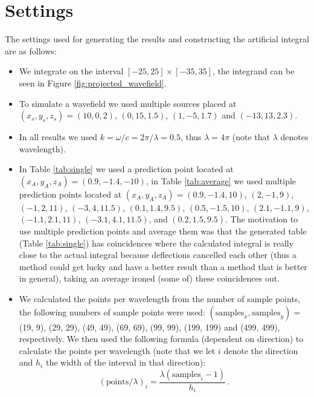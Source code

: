 \section{Settings}
\label{settings}
The settings used for generating the results and constructing the artificial integral are as follows:
\begin{itemize}
    \itemsep0pt
    \item We integrate on the interval $[-25, 25] \times [-35, 35]$, the integrand can be seen in Figure \ref{fig:projected_wavefield}.
    \item To simulate a wavefield we used multiple sources placed at $(x_s, y_s, z_s) = (10, 0, 2)$, $(0, 15, 1.5)$, $(1, -5, 1.7)$ and $(-13, 13, 2.3)$.
    \item In all results we used $k=\omega / c = 2 \pi / \lambda = 0.5$, thus $\lambda = 4 \pi$ (note that $\lambda$ denotes wavelength).
    \item In Table \ref{tab:single} we used a prediction point located at $(x_A, y_A, z_A) = (0.9, -1.4, -10)$, in Table \ref{tab:average} we used multiple prediction points located at $(x_A, y_A, z_A) = (0.9, -1.4, 10)$, $(2, -1, 9)$, $(-1, 2, 11)$, $(-3, 4, 11.5)$, $(0.1, 1.4, 9.5)$, $(0.5, -1.5, 10)$, $(2.1, -1.1, 9)$, $(-1.1, 2.1, 11)$, $(-3.1, 4.1, 11.5)$, and $(0.2, 1.5, 9.5)$. The motivation to use multiple prediction points and average them was that the generated table (Table \ref{tab:single}) has coincidences where the calculated integral is really close to the actual integral because deflections cancelled each other (thus a method could get lucky and have a better result than a method that is better in general), taking an average ironed (some of) these coincidences out.
    \item We calculated the points per wavelength from the number of sample points, the following numbers of sample points were used: $(\textrm{samples}_x, \textrm{samples}_y) =$ (19, 9), (29, 29), (49, 49), (69, 69), (99, 99), (199, 199) and (499, 499), respectively. We then used the following formula (dependent on direction) to calculate the points per wavelength (note that we let $i$ denote the direction and $h_i$ the width of the interval in that direction):
        \begin{equation}
            (\textrm{points} / \lambda)_i = \frac{\lambda (\textrm{samples}_i - 1)}{h_i} \,. \nonumber
        \end{equation}
\end{itemize}

